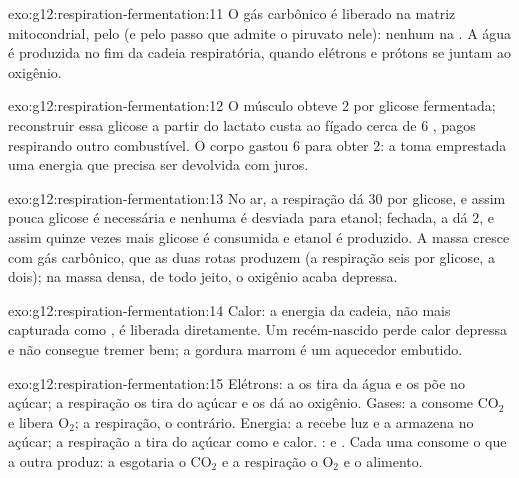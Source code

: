 \begin{solution}{exo:g12:respiration-fermentation:11}
O gás carbônico é liberado na matriz mitocondrial, pelo 
(e pelo passo que admite o piruvato nele): nenhum na . A água
é produzida no fim da cadeia respiratória, quando elétrons e prótons se
juntam ao oxigênio.
\end{solution}

\begin{solution}{exo:g12:respiration-fermentation:12}
O músculo obteve 2  por glicose fermentada; reconstruir essa glicose
a partir do lactato custa ao fígado cerca de 6 , pagos respirando
outro combustível. O corpo gastou 6 para obter 2: a  toma
emprestada uma energia que precisa ser devolvida com juros.
\end{solution}

\begin{solution}{exo:g12:respiration-fermentation:13}
No ar, a respiração dá 30  por glicose, e assim pouca glicose é
necessária e nenhuma é desviada para etanol; fechada, a  dá
2, e assim quinze vezes mais glicose é consumida e etanol é produzido.
A massa cresce com gás carbônico, que as duas rotas produzem (a
respiração seis por glicose, a  dois); na massa densa, de
todo jeito, o oxigênio acaba depressa.
\end{solution}

\begin{solution}{exo:g12:respiration-fermentation:14}
Calor: a energia da cadeia, não mais capturada como , é liberada
diretamente. Um recém-nascido perde calor depressa e não consegue
tremer bem; a gordura marrom é um aquecedor embutido.
\end{solution}

\begin{solution}{exo:g12:respiration-fermentation:15}
Elétrons: a  os tira da água e os põe no açúcar; a
respiração os tira do açúcar e os dá ao oxigênio. Gases: a 
consome $\mathrm{CO_2}$ e libera $\mathrm{O_2}$; a respiração, o
contrário. Energia: a  recebe luz e a armazena no açúcar; a
respiração a tira do açúcar como  e calor. :  e
. Cada uma consome o que a outra produz: a 
esgotaria o $\mathrm{CO_2}$ e a respiração o $\mathrm{O_2}$ e o alimento.
\end{solution}

